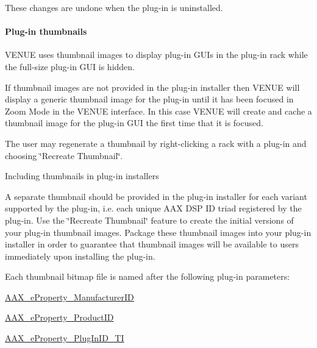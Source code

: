  These changes are undone when the plug-\/in is uninstalled.

\hypertarget{a00377_subsubsection__aax_venue_guide__installer__optional_files__thumbnails}{}\paragraph{Plug-\/in thumbnails}\label{a00377_subsubsection__aax_venue_guide__installer__optional_files__thumbnails}
 V\+E\+N\+U\+E uses thumbnail images to display plug-\/in G\+U\+Is in the plug-\/in rack while the full-\/size plug-\/in G\+U\+I is hidden.

 If thumbnail images are not provided in the plug-\/in installer then V\+E\+N\+U\+E will display a generic thumbnail image for the plug-\/in until it has been focused in Zoom Mode in the V\+E\+N\+U\+E interface. In this case V\+E\+N\+U\+E will create and cache a thumbnail image for the plug-\/in G\+U\+I the first time that it is focused.

 The user may regenerate a thumbnail by right-\/clicking a rack with a plug-\/in and choosing \char`\"{}\+Recreate Thumbnail\char`\"{}.

 Including thumbnails in plug-\/in installers

 A separate thumbnail should be provided in the plug-\/in installer for each variant supported by the plug-\/in, i.\+e. each unique A\+A\+X D\+S\+P I\+D triad registered by the plug-\/in. Use the \char`\"{}\+Recreate Thumbnail\char`\"{} feature to create the initial versions of your plug-\/in thumbnail images. Package these thumbnail images into your plug-\/in installer in order to guarantee that thumbnail images will be available to users immediately upon installing the plug-\/in.

 Each thumbnail bitmap file is named after the following plug-\/in parameters\+: 
\begin{DoxyEnumerate}
\item \hyperlink{a00283_a6571f4e41a5dd06e4067249228e2249ea996465cca29a2a15291d1c788ac5728c}{A\+A\+X\+\_\+e\+Property\+\_\+\+Manufacturer\+I\+D} 
\item \hyperlink{a00283_a6571f4e41a5dd06e4067249228e2249ea3a41fcdff5af1a4fd19dcbca7b1ba6f3}{A\+A\+X\+\_\+e\+Property\+\_\+\+Product\+I\+D} 
\item \hyperlink{a00283_a6571f4e41a5dd06e4067249228e2249ea75f174df4efbeca86eaada126c1d9214}{A\+A\+X\+\_\+e\+Property\+\_\+\+Plug\+In\+I\+D\+\_\+\+T\+I} 
\end{DoxyEnumerate}

